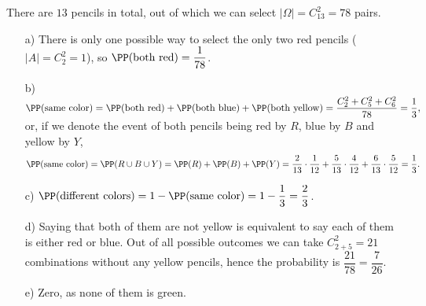 \begin{solution} There are $13$ pencils in total, out of which we can select $|\Omega| = C^2_{13}=78$ pairs.
\begin{enumerate}
    \item[a)] There is only one possible way to select the only two red pencils ($|A|=C^2_2=1$), so $\PP(\text{both red})=\dfrac{1}{78}$.

    \item[b)] $
     \PP(\text{same color}) = 
        \PP({\text{both red}}) 
        + \PP({\text{both blue}})
        + \PP({\text{both yellow}})
        = \dfrac{C_{2}^2+C_{5}^2+C_{6}^2}{78} = \dfrac{1}{3},
    $
    or, if we denote the event of both pencils being red by $R$, blue by $B$ and yellow by $Y$,
    \[
        \PP(\text{same color}) = \PP(R \cup B \cup Y) = \PP(R) + \PP(B) + \PP(Y) = \dfrac{2}{13} \cdot \dfrac{1}{12}
        + \dfrac{5}{13} \cdot \dfrac{4}{12}
        + \dfrac{6}{13} \cdot \dfrac{5}{12} = \dfrac{1}{3}.
    \]
    
    \item[c)] $\PP(\text{different colors}) = 1 - \PP(\text{same color}) = 1 - \dfrac{1}{3} = \dfrac{2}{3}$.


    \item[d)] Saying that both of them are not yellow is equivalent to say each of them is either red or blue. Out of all possible outcomes we can take $C_{2+5}^2=21$ combinations without any yellow pencils, hence the probability is $\dfrac{21}{78}=\dfrac{7}{26}$.
    

    \item[e)] Zero, as none of them is green.
    
\end{enumerate}



\end{solution}
\smallskip

